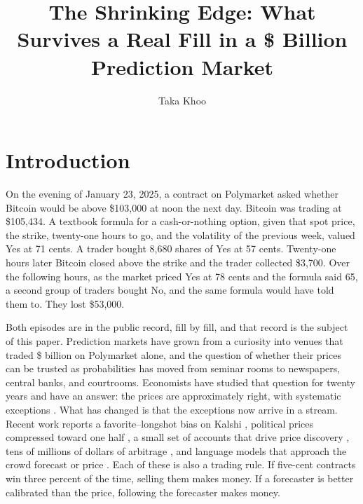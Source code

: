 \documentclass[format=acmsmall, review=false]{acmart}
\title[The Shrinking Edge]{The Shrinking Edge: What Survives a Real Fill in a \$\volumeB{} Billion Prediction Market}
\author{Taka Khoo}
\begin{document}
\maketitle
\thispagestyle{firstpagestyle}

\section{Introduction}

On the evening of January 23, 2025, a contract on Polymarket asked whether Bitcoin would be above \$103,000 at noon the next day. Bitcoin was trading at \$105,434. A textbook formula for a cash-or-nothing option, given that spot price, the strike, twenty-one hours to go, and the volatility of the previous week, valued Yes at 71 cents. A trader bought 8,680 shares of Yes at 57 cents. Twenty-one hours later Bitcoin closed above the strike and the trader collected \$3,700. Over the following hours, as the market priced Yes at 78 cents and the formula said 65, a second group of traders bought No, and the same formula would have told them to. They lost \$53,000.

Both episodes are in the public record, fill by fill, and that record is the subject of this paper. Prediction markets have grown from a curiosity into venues that traded \$\volumeB{} billion on Polymarket alone, and the question of whether their prices can be trusted as probabilities has moved from seminar rooms to newspapers, central banks, and courtrooms. Economists have studied that question for twenty years and have an answer: the prices are approximately right, with systematic exceptions \citep{wolfers2004prediction,page2013prediction}. What has changed is that the exceptions now arrive in a stream. Recent work reports a favorite--longshot bias on Kalshi \citep{burgi2026makers,becker2026microstructure}, political prices compressed toward one half \citep{le2026decomposing}, a small set of accounts that drive price discovery \citep{gomezcram2026prediction}, tens of millions of dollars of arbitrage \citep{saguillo2025unravelling}, and language models that approach the crowd forecast or price \citep{halawi2024approaching,yang2026prophet}. Each of these is also a trading rule. If five-cent contracts win three percent of the time, selling them makes money. If a forecaster is better calibrated than the price, following the forecaster makes money.
\end{document}
